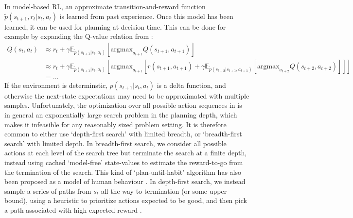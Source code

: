 In model-based RL, an approximate transition-and-reward function $\tilde{p}(s_{t+1}, r_t | s_t, a_t)$ is learned from past experience.
Once this model has been learned, it can be used for planning at decision time.
This can be done for example by expanding the Q-value relation from :
{\small
\begin{align}
    \label{eq:Q-search}
    Q(s_t,a_t) &\approx  r_t + \gamma \mathbb{E}_{\tilde{p}(s_{t+1} | s_t, a_t)} \left [ \text{argmax}_{a_{t+1}} Q(s_{t+1}, a_{t+1}) \right ]\\
    &\approx r_t + \gamma \mathbb{E}_{\tilde{p}(s_{t+1} | s_t, a_t)} \left [ \text{argmax}_{a_{t+1}}
    \left [ r(s_{t+1}, a_{t+1}) + \gamma \mathbb{E}_{\tilde{p}(s_{t+2} | s_{t+1}, a_{t+1})} \left [ \text{argmax}_{a_{t+2}} Q(s_{t+2}, a_{t+2}) \right ] \right ] \right ] \\
    &= \ldots
\end{align}
}
If the environment is determinstic, $p(s_{t+1} | s_t, a_t)$ is a delta function, and otherwise the next-state expectations may need to be approximated with multiple samples.
Unfortunately, the optimization over all possible action sequences in  is in general an exponentially large search problem in the planning depth, which makes it infeasible for any reasonably sized problem setting.
It is therefore common to either use `depth-first search' with limited breadth, or `breadth-first search' with limited depth.
In breadth-first search, we consider all possible actions at each level of the search tree but terminate the search at a finite depth, instead using cached `model-free' state-values to estimate the reward-to-go from the termination of the search.
This kind of `plan-until-habit' algorithm has also been proposed as a model of human behaviour \citep{keramati2016adaptive}.
In depth-first search, we instead sample a series of paths from $s_t$ all the way to termination (or some upper bound), using a heuristic to prioritize actions expected to be good, and then pick a path associated with high expected reward \citep{huys2012bonsai}.



